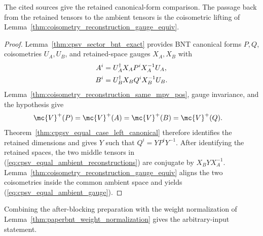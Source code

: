 The cited sources give the retained canonical-form comparison. The passage back
from the retained tensors to the ambient tensors is the coisometric lifting of
Lemma~\ref{thm:coisometry_reconstruction_gauge_equiv}.

\begin{proof}\leanok
    Lemma~\ref{thm:cpsv_sector_bnt_exact} provides
    BNT canonical forms $P,Q$, coisometries $U_A,U_B$, and retained-space
    gauges $X_A,X_B$ with
    \begin{align}
        A^i & =U_A^\dagger X_AP^iX_A^{-1}U_A,
        \notag                                \\
        B^i & =U_B^\dagger X_BQ^iX_B^{-1}U_B.
        \label{eq:cpsv_equal_ambient_reconstructions}
    \end{align}
    Lemma~\ref{thm:coisometry_reconstruction_same_mpv_pos}, gauge invariance,
    and the hypothesis give
    \begin{align}
        \mc{V}^+(P)
         & =\mc{V}^+(A)=\mc{V}^+(B)=\mc{V}^+(Q).
        \label{eq:cpsv_equal_ambient_active_mpv}
    \end{align}
    Theorem~\ref{thm:cpgsv_equal_case_left_canonical} therefore identifies the retained
    dimensions and gives $Y$ such that $Q^i=YP^iY^{-1}$. After identifying the
    retained spaces, the two middle tensors in
    (\ref{eq:cpsv_equal_ambient_reconstructions}) are conjugate by
    $X_BYX_A^{-1}$. Lemma~\ref{thm:coisometry_reconstruction_gauge_equiv}
    aligns the two coisometries inside the common ambient space and yields
    (\ref{eq:cpsv_equal_ambient_gauge}).
\end{proof}

Combining the after-blocking preparation with the weight normalization of
Lemma~\ref{thm:paperbnt_weight_normalization} gives the arbitrary-input
statement.

